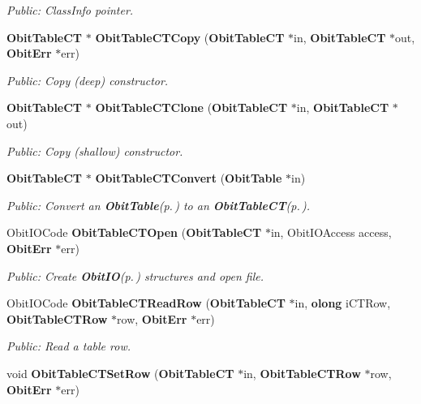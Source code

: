 \begin{CompactItemize}
\begin{CompactList}\small\item\em Public: Class\-Info pointer. \item\end{CompactList}\item 
{\bf Obit\-Table\-CT} $\ast$ {\bf Obit\-Table\-CTCopy} ({\bf Obit\-Table\-CT} $\ast$in, {\bf Obit\-Table\-CT} $\ast$out, {\bf Obit\-Err} $\ast$err)
\begin{CompactList}\small\item\em Public: Copy (deep) constructor. \item\end{CompactList}\item 
{\bf Obit\-Table\-CT} $\ast$ {\bf Obit\-Table\-CTClone} ({\bf Obit\-Table\-CT} $\ast$in, {\bf Obit\-Table\-CT} $\ast$out)
\begin{CompactList}\small\item\em Public: Copy (shallow) constructor. \item\end{CompactList}\item 
{\bf Obit\-Table\-CT} $\ast$ {\bf Obit\-Table\-CTConvert} ({\bf Obit\-Table} $\ast$in)
\begin{CompactList}\small\item\em Public: Convert an {\bf Obit\-Table}{\rm (p.\,\pageref{structObitTable})} to an {\bf Obit\-Table\-CT}{\rm (p.\,\pageref{structObitTableCT})}. \item\end{CompactList}\item 
Obit\-IOCode {\bf Obit\-Table\-CTOpen} ({\bf Obit\-Table\-CT} $\ast$in, Obit\-IOAccess access, {\bf Obit\-Err} $\ast$err)
\begin{CompactList}\small\item\em Public: Create {\bf Obit\-IO}{\rm (p.\,\pageref{structObitIO})} structures and open file. \item\end{CompactList}\item 
Obit\-IOCode {\bf Obit\-Table\-CTRead\-Row} ({\bf Obit\-Table\-CT} $\ast$in, {\bf olong} i\-CTRow, {\bf Obit\-Table\-CTRow} $\ast$row, {\bf Obit\-Err} $\ast$err)
\begin{CompactList}\small\item\em Public: Read a table row. \item\end{CompactList}\item 
void {\bf Obit\-Table\-CTSet\-Row} ({\bf Obit\-Table\-CT} $\ast$in, {\bf Obit\-Table\-CTRow} $\ast$row, {\bf Obit\-Err} $\ast$err)

\end{CompactItemize}

